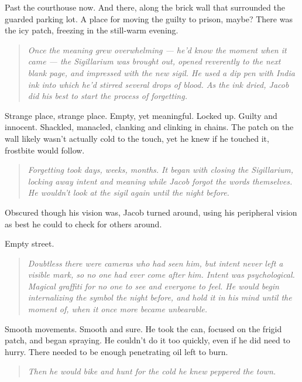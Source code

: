 Past the courthouse now. And there, along the brick wall that surrounded the guarded parking lot. A place for moving the guilty to prison, maybe? There was the icy patch, freezing in the still-warm evening.

\begin{quote}
\emph{Once the meaning grew overwhelming --- he'd know the moment when it came --- the Sigillarium was brought out, opened reverently to the next blank page, and impressed with the new sigil. He used a dip pen with India ink into which he'd stirred several drops of blood. As the ink dried, Jacob did his best to start the process of forgetting.}
\end{quote}

Strange place, strange place. Empty, yet meaningful. Locked up. Guilty and innocent. Shackled, manacled, clanking and clinking in chains. The patch on the wall likely wasn't actually cold to the touch, yet he knew if he touched it, frostbite would follow.

\begin{quote}
\emph{Forgetting took days, weeks, months. It began with closing the Sigillarium, locking away intent and meaning while Jacob forgot the words themselves. He wouldn't look at the sigil again until the night before.}
\end{quote}

Obscured though his vision was, Jacob turned around, using his peripheral vision as best he could to check for others around.

Empty street.

\begin{quote}
\emph{Doubtless there were cameras who had seen him, but intent never left a visible mark, so no one had ever come after him. Intent was psychological. Magical graffiti for no one to see and everyone to feel. He would begin internalizing the symbol the night before, and hold it in his mind until the moment of, when it once more became unbearable.}
\end{quote}

Smooth movements. Smooth and sure. He took the can, focused on the frigid patch, and began spraying. He couldn't do it too quickly, even if he did need to hurry. There needed to be enough penetrating oil left to burn.

\begin{quote}
\emph{Then he would bike and hunt for the cold he knew peppered the town.}
\end{quote}

